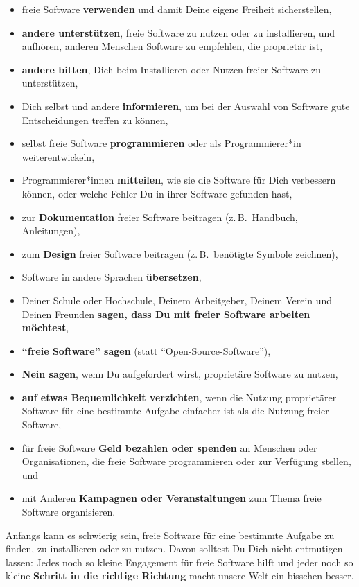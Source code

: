 \documentclass[a5paper,12pt]{scrartcl}
\begin{document}
\begin{itemize}
\item freie Software \textbf{verwenden} und damit Deine eigene
  Freiheit sicherstellen,
\item \textbf{andere unterstützen}, freie Software zu nutzen oder zu
  installieren, und aufhören, anderen Menschen Software zu empfehlen,
  die proprietär ist,
\item \textbf{andere bitten}, Dich beim Installieren oder Nutzen
  freier Software zu unterstützen,
\item Dich selbst und andere \textbf{informieren}, um bei der Auswahl
  von Software gute Entscheidungen treffen zu können,
\item selbst freie Software \textbf{programmieren} oder als
  Programmierer*in weiterentwickeln,
\item Programmierer*innen \textbf{mitteilen}, wie sie die Software für
  Dich verbessern können, oder welche Fehler Du in ihrer Software
  gefunden hast,
\item zur \textbf{Dokumentation} freier Software beitragen (z.\,B.\
  Handbuch, Anleitungen),
\item zum \textbf{Design} freier Software beitragen (z.\,B.\ benötigte
  Symbole zeichnen),
\item Software in andere Sprachen \textbf{übersetzen},
\item Deiner Schule oder Hochschule, Deinem Arbeitgeber, Deinem Verein
  und Deinen Freunden \textbf{sagen, dass Du mit freier Software
  arbeiten möchtest},
\item \textbf{"`freie Software"' sagen} (statt
  "`Open-Source-Software"'),
\item \textbf{Nein sagen}, wenn Du aufgefordert wirst, proprietäre
  Software zu nutzen,
\item \textbf{auf etwas Bequemlichkeit verzichten}, wenn die Nutzung
  proprietärer Software für eine bestimmte Aufgabe einfacher ist als
  die Nutzung freier Software,
\item für freie Software \textbf{Geld bezahlen oder spenden} an
  Menschen oder Organisationen, die freie Software programmieren oder
  zur Verfügung stellen, und
\item mit Anderen \textbf{Kampagnen oder Veranstaltungen} zum Thema
  freie Software organisieren.
\end{itemize}

Anfangs kann es schwierig sein, freie Software für eine bestimmte
Aufgabe zu finden, zu installieren oder zu nutzen. Davon solltest Du
Dich nicht entmutigen lassen: Jedes noch so kleine Engagement für
freie Software hilft und jeder noch so kleine \textbf{Schritt in die
  richtige Richtung} macht unsere Welt ein bisschen besser.
\end{document}
